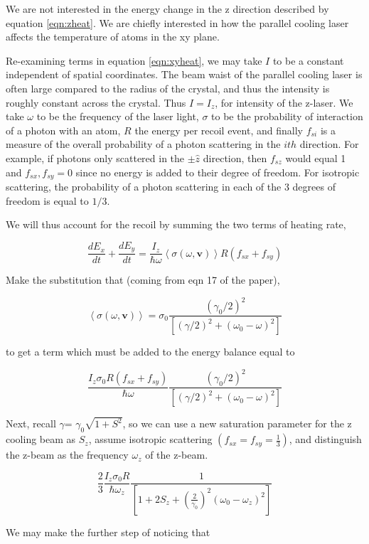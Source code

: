 \documentclass[11pt, oneside,reqno]{amsart}   	%
\newcommand{\eqn}[1]{\begin{equation}#1 \end{equation}}
\renewcommand{\vec}[1]{\textbf{#1}}
\begin{document}
We are not interested in the energy change in the z direction described by equation \ref{eqn:zheat}. We are chiefly interested in how the parallel cooling laser affects the temperature of atoms in the xy plane. 

Re-examining terms in  equation \ref{eqn:xyheat}, we may take $I$ to be a constant independent of spatial coordinates. The beam waist of the parallel cooling laser is often large compared to the radius of the crystal, and thus the intensity is roughly constant across the crystal.  Thus $I = I_z$, for intensity of the z-laser. We take $\omega$ to be the frequency of the laser light, $\sigma$ to be the probability of interaction of a photon with an atom, $R$ the energy per recoil event, and finally $f_{si}$ is a measure of the overall probability of a photon scattering in the $ith$ direction. For example, if photons only scattered in the $\pm\hat{z}$ direction, then $f_{sz}$ would equal 1 and $f_{sx},f_{sy} =0$ since no energy is added to their degree of freedom. For isotropic scattering, the probability of a photon scattering in each of the 3 degrees of freedom is equal to $1/3$.

We will thus account for the recoil by summing the two terms of heating rate,

\eqn{ \frac{dE_x}{dt}+\frac{dE_y}{dt}= \frac{I_z}{\hbar\omega} \left< \sigma (\omega,\vec{v}) \right> R (f_{sx}+f_{sy})}

Make the substitution that (coming from eqn 17 of the paper),

 \eqn{  \left< \sigma (\omega,\vec{v}) \right>  = \sigma_0 \frac{ (\gamma_0/2)^2}{ \left[ (\gamma/2)^2 + (\omega_0 -\omega)^2 \right]} }

to get a term which must be added to the energy balance equal to

\eqn { \frac{I_z \sigma_0 R (f_{sx}+f_{sy})} {\hbar \omega}   \frac{ (\gamma_0/2)^2}{ \left[ (\gamma/2)^2 + (\omega_0 -\omega)^2 \right]}}

 Next, recall $\gamma$= $\gamma_0 \sqrt{ 1+ S^2}$, so we can use a new saturation parameter for the z cooling beam as $S_z$, assume isotropic scattering $(f_{sx}=f_{sy}=\frac{1}{3})$, and distinguish the z-beam as the frequency $\omega_z$ of the z-beam.

\eqn { \frac{2}{3} \frac{I_z \sigma_0 R} {\hbar \omega_z}   \frac{1}{ \left[ 1 + 2S_z+ \left(\frac{2}{\gamma_0}\right)^2(\omega_0 -\omega_z)^2 \right]}}

We may make the further step of noticing that 
\end{document}
